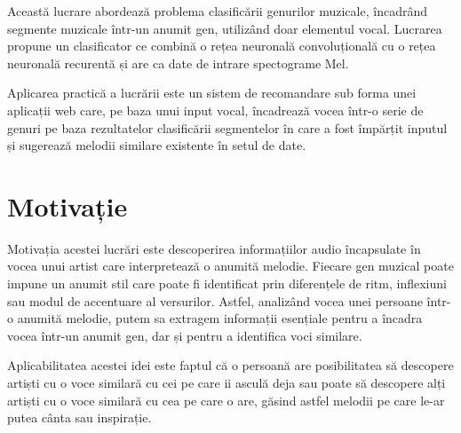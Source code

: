 Această lucrare abordează problema clasificării genurilor muzicale, 
încadrând segmente muzicale într-un anumit gen, 
utilizând doar elementul vocal. Lucrarea propune un clasificator  ce combină 
o rețea neuronală convoluțională cu o rețea 
neuronală recurentă și are ca date de intrare spectograme Mel. 

Aplicarea practică a lucrării este un sistem de recomandare sub forma unei aplicații web care,
 pe baza unui input vocal,
 încadrează vocea într-o serie de genuri pe baza rezultatelor clasificării segmentelor
 în care a fost împărțit inputul și sugerează melodii similare existente în setul de date.

\section{Motivație}
Motivația acestei lucrări este descoperirea informațiilor audio încapsulate în vocea unui artist care interpretează o anumită melodie.
Fiecare gen muzical poate impune un anumit stil care poate fi identificat prin diferențele de ritm, inflexiuni sau modul de accentuare al versurilor. 
Astfel, analizând vocea unei persoane într-o anumită melodie, putem sa extragem informații esențiale pentru a încadra vocea într-un anumit gen, dar și
pentru a identifica voci similare. 

Aplicabilitatea acestei idei este faptul că o persoană are posibilitatea să descopere artiști cu o voce similară cu cei pe care ii asculă deja sau 
poate să descopere alți artiști cu o voce similară cu cea pe care o are, găsind astfel melodii pe care le-ar putea cânta sau inspirație.